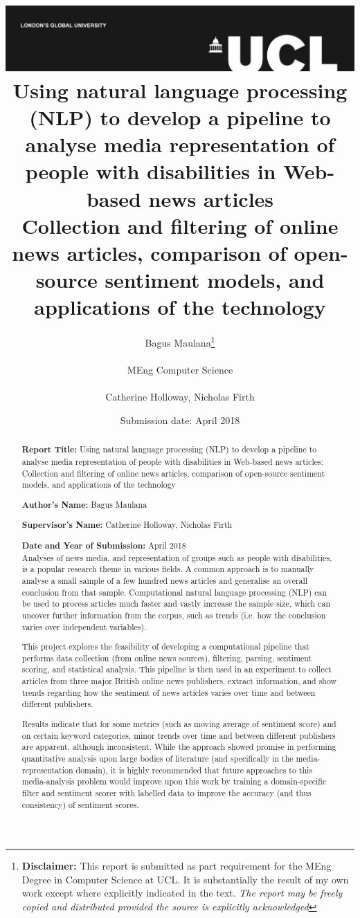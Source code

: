 \documentclass{report}
\title{{\vspace{-14em} \includegraphics[scale=0.4]{ucl_logo.png}}\\
{{\Huge Using natural language processing (NLP) to develop a pipeline to analyse media representation of people with disabilities in Web-based news articles}}\\
{\large Collection and filtering of online news articles, comparison of open-source sentiment models, and applications of the technology
}\\
}
\date{Submission date: \nth{30} April 2018}
\author{Bagus Maulana\thanks{
{\bf Disclaimer:}
This report is submitted as part requirement for the MEng Degree in Computer Science at UCL. It is
substantially the result of my own work except where explicitly indicated in the text.
\emph{The report may be freely copied and distributed provided the source is explicitly acknowledged}}
\\ \\
MEng Computer Science\\ \\
Catherine Holloway, Nicholas Firth}
\begin{document}
 
\onehalfspacing
\maketitle
\begin{abstract}

\textbf{Report Title:}  Using natural language processing (NLP) to develop a pipeline to analyse media representation of people with disabilities in Web-based news articles: Collection and filtering of online news articles, comparison of open-source sentiment models, and applications of the technology

\textbf{Author’s Name:} Bagus Maulana

\textbf{Supervisor’s Name:} Catherine Holloway, Nicholas Firth

\textbf{Date and Year of Submission:}  April 2018\\

Analyses of news media, and representation of groups such as people with disabilities, is a popular research theme in various fields. 
A common approach is to manually analyse a small sample of a few hundred news articles and generalise an overall conclusion from that sample. 
Computational natural language processing (NLP) can be used to process articles much faster and vastly increase the sample size, which can uncover further information from the corpus, such as trends (i.e. how the conclusion varies over independent variables).

This project explores the feasibility of developing a computational pipeline that performs data collection (from online news sources), filtering, parsing, sentiment scoring, and statistical analysis.
This pipeline is then used in an experiment to collect articles from three major British online news publishers, extract information, and show trends regarding how the sentiment of news articles varies over time and between different publishers.

Results indicate that for some metrics (such as moving average of sentiment score) and on certain keyword categories, minor trends over time and between different publishers are apparent, although inconsistent. 
While the approach showed promise in performing quantitative analysis upon large bodies of literature (and specifically in the media-representation domain), it is highly recommended that future approaches to this media-analysis problem would improve upon this work by training a domain-specific filter and sentiment scorer with labelled data to improve the accuracy (and thus consistency) of sentiment scores.

\end{abstract}
\tableofcontents
\setcounter{page}{1}
\end{document}
